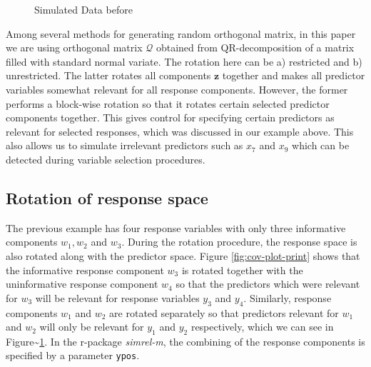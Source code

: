\documentclass[review]{elsarticle}
\theoremstyle{definition}
\theoremstyle{definition}
\theoremstyle{remark}
\begin{document}
\begin{figure}[!htb]

{\centering {}

}

\caption{Simulated Data before}\label{fig:simulated-data}
\end{figure}

Among several methods
\citep{anderson1987generation, heiberger1978algorithm} for generating
random orthogonal matrix, in this paper we are using orthogonal matrix
\(\mathcal{Q}\) obtained from QR-decomposition of a matrix filled with
standard normal variate. The rotation here can be a) restricted and b)
unrestricted. The latter rotates all components \(\mathbf{z}\) together
and makes all predictor variables somewhat relevant for all response
components. However, the former performs a block-wise rotation so that
it rotates certain selected predictor components together. This gives
control for specifying certain predictors as relevant for selected
responses, which was discussed in our example above. This also allows us
to simulate irrelevant predictors such as \(x_{7}\) and \(x_{9}\) which
can be detected during variable selection procedures.

\hypertarget{rotation-of-response-space}{\subsection{Rotation of
response space}\label{rotation-of-response-space}}

The previous example has four response variables with only three
informative components \(w_1, w_2\) and \(w_3\). During the rotation
procedure, the response space is also rotated along with the predictor
space. Figure \ref{fig:cov-plot-print} shows that the informative
response component \(w_3\) is rotated together with the uninformative
response component \(w_4\) so that the predictors which were relevant
for \(w_3\) will be relevant for response variables \(y_3\) and \(y_4\).
Similarly, response components \(w_1\) and \(w_2\) are rotated
separately so that predictors relevant for \(w_1\) and \(w_2\) will only
be relevant for \(y_1\) and \(y_2\) respectively, which we can see in
Figure\textasciitilde{}\ref{fig:simulated-data}. In the r-package
\emph{simrel-m}, the combining of the response components is specified
by a parameter \texttt{ypos}.
\end{document}
